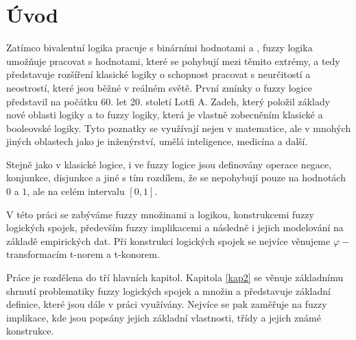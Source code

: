 


\newtheorem{definition}{Definice}
\newtheorem{remark}{Pozn\'amka}
\newtheorem{example}{Příklad}
\newtheorem{graph}{Obr\' azek}
\newtheorem{sentence}{Věta}
\newtheorem{tabul}{Tabulka}


\chapter{Úvod}
 Zatímco bivalentní logika pracuje s binárními hodnotami  a , fuzzy logika umožňuje pracovat s hodnotami, které se pohybují mezi těmito extrémy, a tedy představuje rozšíření klasické logiky o schopnost pracovat s neurčitostí a neostrostí, které jsou běžné v reálném světě. První zmínky o fuzzy logice představil na počátku 60. let 20. století Lotfi A. Zadeh, který položil základy nové oblasti logiky a to fuzzy logiky, která je vlastně zobecněním klasické a booleovské logiky. Tyto poznatky se využívají nejen v matematice, ale  v mnohých jiných oblastech jako je inženýrství, umělá inteligence, medicína a další. 
 
 Stejně jako v klasické logice, i ve fuzzy logice jsou definovány operace negace, konjunkce, disjunkce a jiné s tím rozdílem, že se nepohybují pouze na hodnotách $0$ a $1$, ale na celém intervalu $[0,1].$

 V této práci se zabýváme fuzzy množinami a logikou, konstrukcemi fuzzy logických spojek, především fuzzy implikacemi a následně i jejich modelování na základě empirických dat. Při konstrukci logických spojek se nejvíce věnujeme $\varphi-$transformacím t-norem a t-konorem.

 Práce je rozdělena do tří hlavních kapitol. Kapitola \ref{kap2} se věnuje základnímu shrnutí problematiky fuzzy logických spojek a množin a představuje základní definice, které jsou dále v práci využívány. Nejvíce se pak zaměřuje na fuzzy implikace, kde jsou popsány jejich základní vlastnosti, třídy a jejich známé konstrukce.

